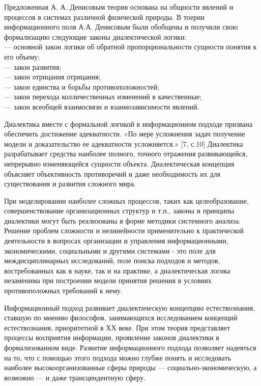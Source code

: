 \documentclass[a4paper,12pt]{report}
\begin{document}
Предложенная А. А. Денисовым теория основана на общности явлений и процессов в системах различной физической природы. В тоерии информационного поля А.А. Денисовым были обобщены и получили свою формализацию следующие законы диалектической логики:\\
\hspace*{0.7cm}—  основной закон логики об обратной пропорциональности сущности понятия к его объему;\\
\hspace*{0.7cm}—  закон развития;\\
\hspace*{0.7cm}—  закон отрицания отрицания;\\
\hspace*{0.7cm}—  закон единства и борьбы противоположностей;\\
\hspace*{0.7cm}—  закон перехода колличественных изменений в качественные;\\
\hspace*{0.7cm}—  закон всеобщей взаимосвязи и взаимозависимости явлений.

Диалектика вместе с формальной логикой в информационном подходе призвана обеспечить достижение  адекватности. «По мере усложнения задач получение модели и доказательство ее адекватности усложняется.» [7, с.10] Диалектика разрабатывает средства наиболее полного, точного отражения развивающейся, непрерывно изменяющейся сущности объекта. Диалектическая концепция объясняет объективность противоречий и даже необходимость их для существования и развития сложного мира.

При моделировании наиболее сложных процессов, таких как целеобразование, совершенствование организационных структур и т.п., законы и принципы диалектики могут быть реализованы в форме методики системного анализа. 
Решение проблем сложности и нелинейности применительно к практической деятельности в вопросах организации и управления информационными, экономическими, социальными и другими системами - это поле для междисциплинарных исследований, поле поиска подходов и методов, востребованных как в науке, так и на практике, а диалектическая логика незаменима при построении модели принятия решения в условиях противоположных требований к нему.

Информационный подход развивает диалектическую концепцию естествознания, ставшую по мнению философов, занимающихся исследованием концепций естествознания, приоритетной в ХХ веке. При этом теория представляет процессы восприятия информации, проявление законов диалектики в формализованном виде. Развитие информационного подхода позволяет надеяться на то, что с помощью этого подхода можно глубже понять и исследовать наиболее высокоорганизованные сферы природы — социально-экономическую, а возможно — и даже трансцендентную сферу.
\end{document}
